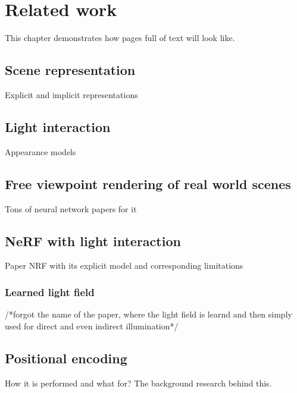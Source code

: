 \chapter{Related work}
\label{chap:related_work}

This chapter demonstrates how pages full of text will look like.


\section{Scene representation}

Explicit and implicit representations




\section{Light interaction}

Appearance models




\section{Free viewpoint rendering of real world scenes}

Tons of neural network papers for it





\section{NeRF with light interaction}

Paper NRF with its explicit model and corresponding limitations

\subsection{Learned light field}

/*forgot the name of the paper, where the light field is learnd and then simply used for direct and even indirect illumination*/




\section{Positional encoding}

How it is performed and what for? The background research behind this.


